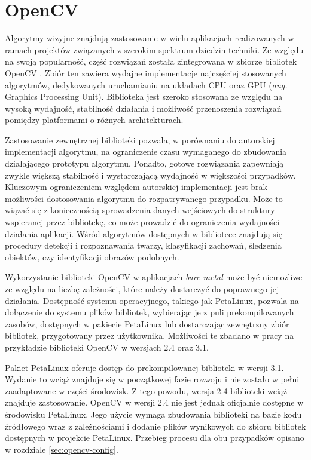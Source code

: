 
\section{OpenCV}
\label{sec:opencv-lib}

Algorytmy wizyjne znajdują zastosowanie w wielu aplikacjach realizowanych w ramach projektów związanych z szerokim spektrum dziedzin techniki. 
Ze względu na swoją popularność, część rozwiązań została zintegrowana w zbiorze bibliotek OpenCV \cite{opencv-library}. 
Zbiór ten zawiera wydajne implementacje najczęściej stosowanych algorytmów, dedykowanych uruchamianiu na układach CPU oraz GPU (\emph{ang.} Graphics Processing Unit). 
Biblioteka jest szeroko stosowana ze względu na wysoką wydajność, stabilność działania i możliwość przenoszenia rozwiązań pomiędzy platformami o różnych architekturach.

Zastosowanie zewnętrznej biblioteki pozwala, w porównaniu do autorskiej implementacji algorytmu, na ograniczenie czasu wymaganego do zbudowania działającego prototypu algorytmu. 
Ponadto, gotowe rozwiązania zapewniają zwykle większą stabilność i wystarczającą wydajność w większości przypadków. 
Kluczowym ograniczeniem względem autorskiej implementacji jest brak możliwości dostosowania algorytmu do rozpatrywanego przypadku. 
Może to wiązać się z koniecznością sprowadzenia danych wejściowych do struktury wspieranej przez bibliotekę, co może prowadzić do ograniczenia wydajności działania aplikacji.
Wśród algorytmów dostępnych w bibliotece znajdują się procedury detekcji i rozpoznawania twarzy, klasyfikacji zachowań, śledzenia obiektów, czy identyfikacji obrazów podobnych.

Wykorzystanie biblioteki OpenCV w aplikacjach \textit{bare-metal} może być niemożliwe ze względu na liczbę zależności, które należy dostarczyć do poprawnego jej działania. 
Dostępność systemu operacyjnego, takiego jak PetaLinux, pozwala na dołączenie do systemu plików bibliotek, wybierając je z puli prekompilowanych zasobów, dostępnych w pakiecie PetaLinux lub dostarczając zewnętrzny zbiór bibliotek, przygotowany przez użytkownika. 
Możliwości te zbadano w pracy na przykładzie biblioteki OpenCV w wersjach 2.4 oraz 3.1.

Pakiet PetaLinux oferuje dostęp do prekompilowanej biblioteki w wersji 3.1. 
Wydanie to wciąż znajduje się w początkowej fazie rozwoju i nie zostało w pełni zaadaptowane w części środowisk. 
Z tego powodu, wersja 2.4 biblioteki wciąż znajduje zastosowanie.
OpenCV w wersji 2.4 nie jest jednak oficjalnie dostępne w środowisku PetaLinux. 
Jego użycie wymaga zbudowania biblioteki na bazie kodu źródłowego wraz z zależnościami i dodanie plików wynikowych do zbioru bibliotek dostępnych w projekcie PetaLinux.
Przebieg procesu dla obu przypadków opisano w rozdziale \ref{sec:opencv-config}.

